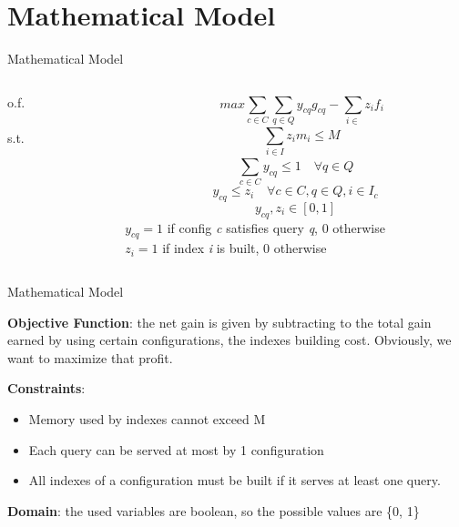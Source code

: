 \documentclass[12pt]{beamer}
\begin{document}
  \section{Mathematical Model}
  \begin{frame}[fragile]{Mathematical Model}
  	\begin{columns}
  		\begin{column}[T]{0.05\textwidth}
  			o.f.\\~\\
  			s.t.
  		\end{column}
  		\begin{column}[T]{0.95\textwidth}
  			$$\quad max \sum_{c\in C}^{} \sum_{q\in Q}^{} y_{cq} g_{cq}  -  \sum_{i\in 	}^{}	 z_i f_i$$
  			$$\quad \sum_{i\in I}^{} z_i m_i \leq M$$
  			$$\sum_{c\in C}^{} y_{cq} \leq 1 \quad\forall q \in Q $$
  			$$y_{cq} \leq z_i \quad\forall c \in C, q \in Q, i \in I_c$$
  			$$y_{cq}, z_i \in [0,1]$$
  			$y_{cq} = 1$ if config \emph{c} satisfies query \emph{q}, 0 otherwise\\
  			$z_i = 1$ if index \emph{i} is built, 0 otherwise
  		\end{column}
  	\end{columns}
  \end{frame}
  \begin{frame}[fragile]{Mathematical Model}

      \textbf{Objective Function}: the net gain is given by subtracting to the total gain earned by using certain configurations, the indexes building cost. Obviously, we want to maximize that profit. 

      \textbf{Constraints}:
      \begin{itemize}
        \item Memory used by indexes cannot exceed M
        \item Each query can be served at most by 1 configuration
        \item All indexes of a configuration must be built if it serves at least one query.
      \end{itemize}

      \textbf{Domain}: the used variables are boolean, so the possible values are \{0, 1\}
  \end{frame}
\end{document}

